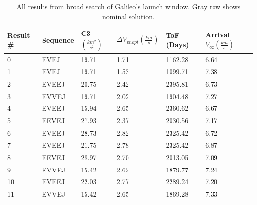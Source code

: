 \documentclass[letterpaper, preprint, paper,11pt]{AAS}	%
\begin{document}
\begin{table}[h!]
    \centering
    \caption{All results from broad search of Galileo's launch window. Gray row shows nominal solution.}
    \begin{tabular}{l|lllll}
    Result \# & Sequence   & C3 $(\frac{km^2}{s^2})$    & $\Delta V_{unopt} (\frac{km}{s})$   & ToF (Days)            & Arrival $V_\infty (\frac{km}{s})$            \\
    \hline
    0         & EVEJ  & 19.71 & 1.71 & 1162.28        & 6.64 \\
    1         & EVEJ  & 19.71 & 1.53 & 1099.71        & 7.38 \\
    2         & EVEEJ & 20.75 & 2.42 & 2395.81        & 6.73 \\
    3         & EVVEJ & 19.71 & 2.02 & 1904.48        & 7.27 \\
    4         & EVEEJ & 15.94 & 2.65 & 2360.62        & 6.67 \\
    5         & EEVEJ & 27.93 & 2.37 & 2030.56        & 7.17 \\
    6         & EVEEJ & 28.73 & 2.82 & 2325.42        & 6.72 \\
    \rowcolor{lightgray}7         & EVEEJ & 21.75 & 2.78 & 2325.42        & 6.87 \\
    8         & EEVEJ & 28.97 & 2.70 & 2013.05        & 7.09 \\
    9         & EVVEJ & 15.42 & 2.62 & 1879.77        & 7.24 \\
    10        & EVEEJ & 22.03 & 2.77 & 2289.24        & 7.20 \\
    11        & EVVEJ & 15.42 & 2.65 & 1869.28        & 7.33
    \end{tabular}
\end{table}

\newpage
\end{document}
